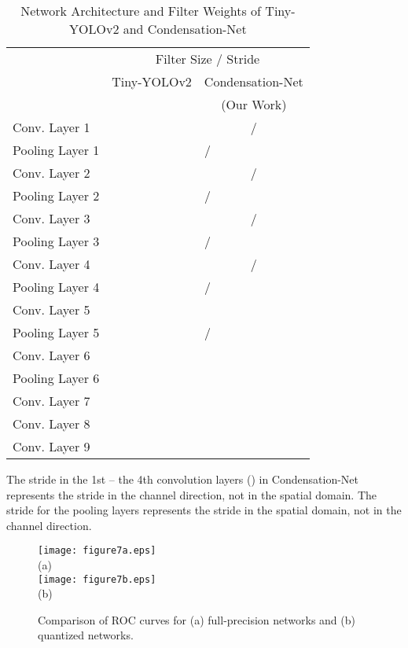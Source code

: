 \documentclass[10pt,twocolumn,letterpaper]{article}
\begin{document}
\begin{table}
\begin{center}
\begin{tabular}{l|c|c}
\hline
  & \multicolumn{2}{c}{Filter Size / Stride}   \\
  \cline{2-3}
  & Tiny-YOLOv2 & Condensation-Net  \\
  &    ~\cite{Redmon17, Wai18}  & (Our Work)  \\
\hline\hline
Conv. Layer 1    &     &  / \\
\hline
Pooling Layer 1  & \multicolumn{2}{c}{ / }\\          
\hline
Conv. Layer 2    &     &  / \\
\hline
Pooling Layer 2  & \multicolumn{2}{c}{ / }\\          
\hline
Conv. Layer 3    &     &  / \\
\hline
Pooling Layer 3  & \multicolumn{2}{c}{ / }\\          
\hline
Conv. Layer 4    &    &  / \\
\hline
Pooling Layer 4  & \multicolumn{2}{c}{ / }\\          
\hline
Conv. Layer 5    & \multicolumn{2}{c}{}\\          
\hline
Pooling Layer 5  & \multicolumn{2}{c}{ / }\\          
\hline
Conv. Layer 6    & \multicolumn{2}{c}{}\\          
\hline
Pooling Layer 6  & \multicolumn{2}{c}{}\\          
\hline
Conv. Layer 7    & \multicolumn{2}{c}{}\\          
\hline
Conv. Layer 8    & \multicolumn{2}{c}{}\\          
\hline
Conv. Layer 9    & \multicolumn{2}{c}{}\\          
\hline
\end{tabular}
\end{center}
{\small
The stride in the 1st -- the 4th convolution layers () in Condensation-Net represents the stride in the channel direction, not in the spatial domain. The stride for the pooling layers represents the stride in the spatial domain, not in the channel direction.\\
}
\caption{Network Architecture and Filter Weights of Tiny-YOLOv2 and Condensation-Net}
\label{tab:network}
\end{table}

\begin{figure}[t]
\begin{center}
\texttt{[image: figure7a.eps]}\\
   (a)\\
   \texttt{[image: figure7b.eps]}\\
   (b)\\
\end{center}
   \caption{Comparison of ROC curves for (a) full-precision networks and (b) quantized networks.}
\label{fig:roc}
\end{figure}
\end{document}
